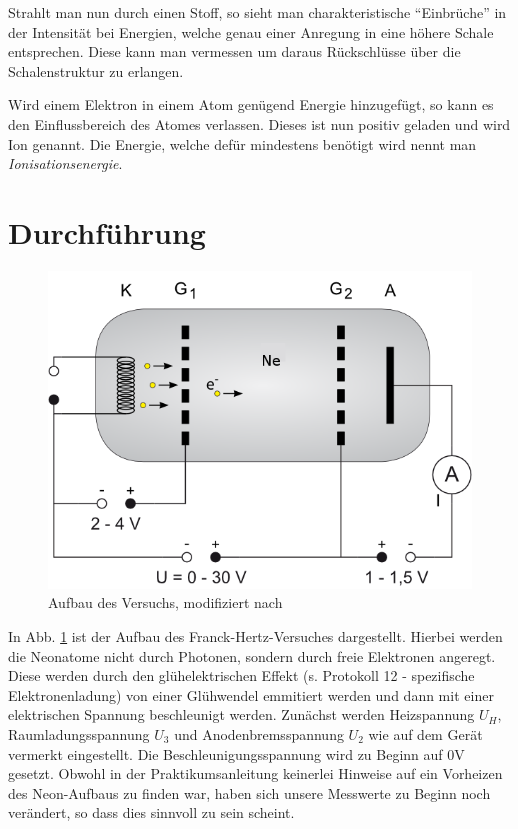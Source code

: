 \documentclass[12pt,a4paper,titlepage,headinclude,bibtotoc]{scrartcl}
\begin{document}
Strahlt man nun durch einen Stoff, so sieht man charakteristische "`Einbrüche"' in der Intensität bei Energien, welche genau einer Anregung in eine höhere Schale entsprechen.
Diese kann man vermessen um daraus Rückschlüsse über die Schalenstruktur zu erlangen.

Wird einem Elektron in einem Atom genügend Energie hinzugefügt, so kann es den Einflussbereich des Atomes verlassen.
Dieses ist nun positiv geladen und wird Ion genannt.
Die Energie, welche defür mindestens benötigt wird nennt man \textit{Ionisationsenergie}.
                                                                                                                                                                      
\section{Durchführung}
\label{sec:durchfuehrung}
\begin{figure}[h]
\centering
\includegraphics{RoehreNe}
\caption{Aufbau des Versuchs, modifiziert nach \cite[12.03.2015,16 Uhr]{lp22}}
\label{fig:aufbau}
\end{figure}
In Abb. \ref{fig:aufbau} ist der Aufbau des Franck-Hertz-Versuches dargestellt.
Hierbei werden die Neonatome nicht durch Photonen, sondern durch freie Elektronen angeregt.
Diese werden durch den glühelektrischen Effekt (s. Protokoll 12 - spezifische Elektronenladung) von einer Glühwendel emmitiert werden und dann mit einer elektrischen Spannung beschleunigt werden.
Zunächst werden Heizspannung $U_H$, Raumladungsspannung $U_3$ und Anodenbremsspannung $U_2$ wie auf dem Gerät vermerkt eingestellt.
Die Beschleunigungsspannung wird zu Beginn auf $0\si\volt$ gesetzt.
Obwohl in der Praktikumsanleitung keinerlei Hinweise auf ein Vorheizen des Neon-Aufbaus zu finden war, haben sich unsere Messwerte zu Beginn noch verändert, so dass dies sinnvoll zu sein scheint.
\end{document}
